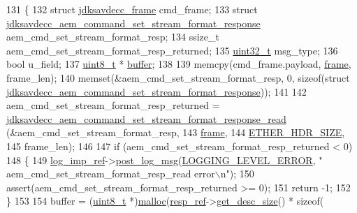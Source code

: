 \begin{DoxyCode}
131 \{
132     \textcolor{keyword}{struct }\hyperlink{structjdksavdecc__frame}{jdksavdecc\_frame} cmd\_frame;
133     \textcolor{keyword}{struct }\hyperlink{structjdksavdecc__aem__command__set__stream__format__response}{jdksavdecc\_aem\_command\_set\_stream\_format\_response}
       aem\_cmd\_set\_stream\_format\_resp;
134     ssize\_t aem\_cmd\_set\_stream\_format\_resp\_returned;
135     \hyperlink{parse_8c_a6eb1e68cc391dd753bc8ce896dbb8315}{uint32\_t} msg\_type;
136     \textcolor{keywordtype}{bool} u\_field;
137     \hyperlink{stdint_8h_aba7bc1797add20fe3efdf37ced1182c5}{uint8\_t} * \hyperlink{_hello_test_8cpp_a8be6d469a7cd1c8d66cc6d2d1e10c65b}{buffer};
138 
139     memcpy(cmd\_frame.payload, \hyperlink{gst__avb__playbin_8c_ac8e710e0b5e994c0545d75d69868c6f0}{frame}, frame\_len);
140     memset(&aem\_cmd\_set\_stream\_format\_resp, 0, \textcolor{keyword}{sizeof}(\textcolor{keyword}{struct} 
      \hyperlink{structjdksavdecc__aem__command__set__stream__format__response}{jdksavdecc\_aem\_command\_set\_stream\_format\_response}));
141 
142     aem\_cmd\_set\_stream\_format\_resp\_returned = 
      \hyperlink{group__command__set__stream__format__response_ga6e89b94300d1d27dc34f6b57fa234690}{jdksavdecc\_aem\_command\_set\_stream\_format\_response\_read}
      (&aem\_cmd\_set\_stream\_format\_resp,
143                                                                                                      
      \hyperlink{gst__avb__playbin_8c_ac8e710e0b5e994c0545d75d69868c6f0}{frame},
144                                                                                                      
      \hyperlink{namespaceavdecc__lib_a6c827b1a0d973e18119c5e3da518e65ca9512ad9b34302ba7048d88197e0a2dc0}{ETHER\_HDR\_SIZE},
145                                                                                                      
      frame\_len);
146 
147     \textcolor{keywordflow}{if} (aem\_cmd\_set\_stream\_format\_resp\_returned < 0)
148     \{
149         \hyperlink{namespaceavdecc__lib_acbe3e2a96ae6524943ca532c87a28529}{log\_imp\_ref}->\hyperlink{classavdecc__lib_1_1log_a68139a6297697e4ccebf36ccfd02e44a}{post\_log\_msg}(\hyperlink{namespaceavdecc__lib_a501055c431e6872ef46f252ad13f85cdaf2c4481208273451a6f5c7bb9770ec8a}{LOGGING\_LEVEL\_ERROR}, \textcolor{stringliteral}{"
      aem\_cmd\_set\_stream\_format\_resp\_read error\(\backslash\)n"});
150         assert(aem\_cmd\_set\_stream\_format\_resp\_returned >= 0);
151         \textcolor{keywordflow}{return} -1;
152     \}
153 
154     buffer = (\hyperlink{stdint_8h_aba7bc1797add20fe3efdf37ced1182c5}{uint8\_t} *)\hyperlink{_memory_leak_detector_malloc_macros_8h_ab8b25cd8f16d4a6552afe4e65c4f082d}{malloc}(\hyperlink{classavdecc__lib_1_1descriptor__base__imp_a2642e3a7c10d38553e7ff4a55e875346}{resp\_ref}->\hyperlink{classavdecc__lib_1_1response__frame_a5302ae13c549f066040ce0e7c7d11ae6}{get\_desc\_size}() * \textcolor{keyword}{sizeof}(

\end{DoxyCode}

